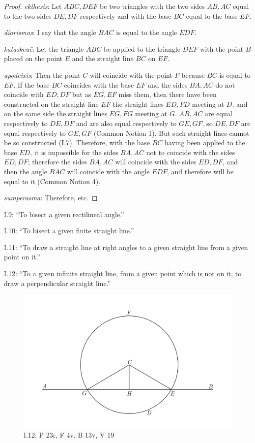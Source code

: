 \documentclass{article}
\begin{document}
\begin{proof}
{\em ekthesis}: Let $ABC,DEF$ be two triangles with the two sides $AB,AC$ equal to the two sides $DE,DF$ respectively
and with the base $BC$ equal to the base $EF$. 

{\em diorismos}: I say that the angle $BAC$ is equal to the angle $EDF$.

{\em kataskeu\={e}}: Let the triangle $ABC$ be applied to the triangle $DEF$ with the point $B$ placed on the point $E$
and the straight line $BC$ on $EF$.

{\em apodeixis}: Then the point $C$ will coincide with the point $F$ because
$BC$ is equal to $EF$.
If the base $BC$ coincides with the base $EF$ and the sides $BA,AC$ do not coincide with $ED,DF$ but
 as $EG,EF$ miss them, then there have been constructed on the straight line
$EF$ the straight lines $ED,FD$ meeting at $D$, and on the same side
the straight lines $EG,FG$
meeting at $G$. $AB,AC$ are equal respectively to $DE,DF$ and are also
equal respectively to $GE,GF$, so 
$DE,DF$ are equal respectively to $GE,GF$ (Common Notion 1). But such straight lines cannot be so constructed (I.7). 
Therefore, with the base $BC$ having been applied to the base $ED$, it is impossible for the sides $BA,AC$ not to coincide with the sides
$ED,DF$; therefore the sides $BA,AC$ will coincide with the sides $ED,DF$, and then
the angle $BAC$ will coincide with the angle $EDF$, and therefore will be equal to it (Common Notion 4).

{\em sumperasma}: Therefore, etc.
\end{proof}

I.9: ``To bisect a given rectilineal angle.''

I.10: ``To bisect a given finite straight line.''

I.11: ``To draw a straight line at right angles to a given straight
line from a given point on it.''

I.12: ``To a given infinite straight line, from a given point
which is not on it, to draw a perpendicular straight line.''


\begin{figure}
\begin{center}
\includegraphics[width=\textwidth]{I12.png}
\end{center}
\caption{I.12: P 23r, F 4v, B 13v, V 19}
\label{I12}
\end{figure}
\end{document}
